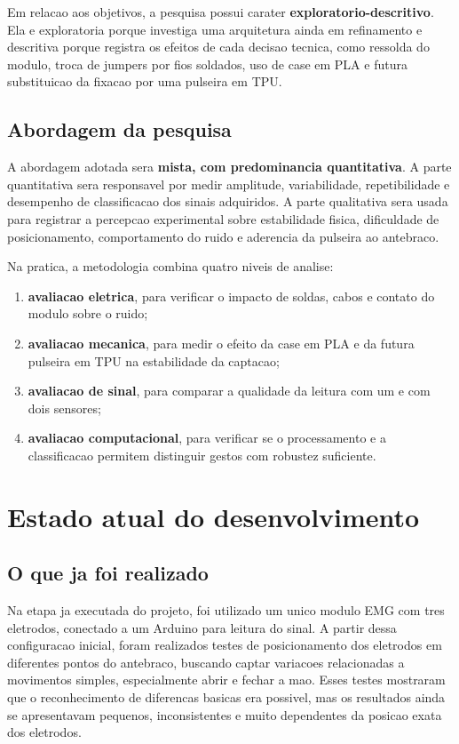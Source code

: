 \documentclass[12pt,oneside,a4paper,brazilian]{abntex2}
\begin{document}
Em relacao aos objetivos, a pesquisa possui carater \textbf{exploratorio-descritivo}. Ela e exploratoria porque investiga uma arquitetura ainda em refinamento e descritiva porque registra os efeitos de cada decisao tecnica, como ressolda do modulo, troca de jumpers por fios soldados, uso de case em PLA e futura substituicao da fixacao por uma pulseira em TPU.

\subsection{Abordagem da pesquisa}

A abordagem adotada sera \textbf{mista, com predominancia quantitativa}. A parte quantitativa sera responsavel por medir amplitude, variabilidade, repetibilidade e desempenho de classificacao dos sinais adquiridos. A parte qualitativa sera usada para registrar a percepcao experimental sobre estabilidade fisica, dificuldade de posicionamento, comportamento do ruido e aderencia da pulseira ao antebraco.

Na pratica, a metodologia combina quatro niveis de analise:

\begin{enumerate}
  \item \textbf{avaliacao eletrica}, para verificar o impacto de soldas, cabos e contato do modulo sobre o ruido;
  \item \textbf{avaliacao mecanica}, para medir o efeito da case em PLA e da futura pulseira em TPU na estabilidade da captacao;
  \item \textbf{avaliacao de sinal}, para comparar a qualidade da leitura com um e com dois sensores;
  \item \textbf{avaliacao computacional}, para verificar se o processamento e a classificacao permitem distinguir gestos com robustez suficiente.
\end{enumerate}

\section{Estado atual do desenvolvimento}

\subsection{O que ja foi realizado}

Na etapa ja executada do projeto, foi utilizado um unico modulo EMG com tres eletrodos, conectado a um Arduino para leitura do sinal. A partir dessa configuracao inicial, foram realizados testes de posicionamento dos eletrodos em diferentes pontos do antebraco, buscando captar variacoes relacionadas a movimentos simples, especialmente abrir e fechar a mao. Esses testes mostraram que o reconhecimento de diferencas basicas era possivel, mas os resultados ainda se apresentavam pequenos, inconsistentes e muito dependentes da posicao exata dos eletrodos.
\end{document}
